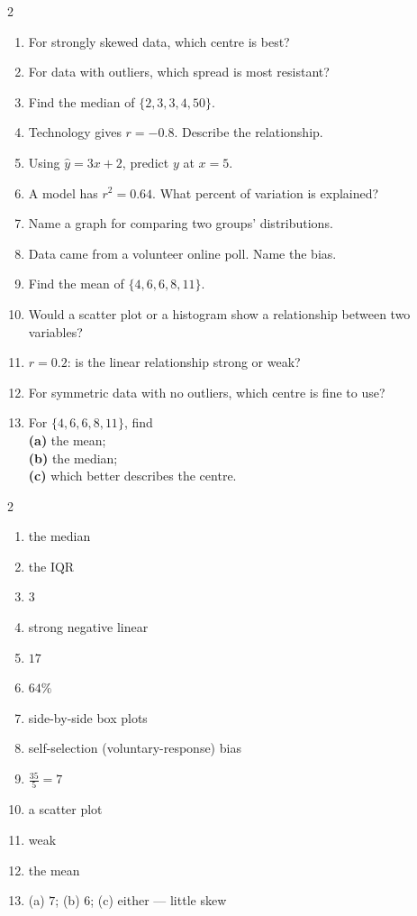 \documentclass[11pt]{article}
\begin{document}
\clearpage
{}

\begin{recapbox}
\begin{multicols}{2}
\small
\begin{enumerate}[leftmargin=*,itemsep=3pt]
  \item For strongly skewed data, which centre is best?
  \item For data with outliers, which spread is most resistant?
  \item Find the median of $\{2,3,3,4,50\}$.
  \item Technology gives $r=-0.8$. Describe the relationship.
  \item Using $\hat y=3x+2$, predict $y$ at $x=5$.
  \item A model has $r^{2}=0.64$. What percent of variation is explained?
  \item Name a graph for comparing two groups' distributions.
  \item Data came from a volunteer online poll. Name the bias.
  \item Find the mean of $\{4,6,6,8,11\}$.
  \item Would a scatter plot or a histogram show a relationship between two variables?
  \item $r=0.2$: is the linear relationship strong or weak?
  \item For symmetric data with no outliers, which centre is fine to use?
  \item For $\{4,6,6,8,11\}$, find \\ \textbf{(a)} the mean; \\ \textbf{(b)} the median; \\ \textbf{(c)} which better describes the centre.
\end{enumerate}
\end{multicols}
\end{recapbox}

\begin{keybox}
\begin{multicols}{2}
\small
\begin{enumerate}[leftmargin=*,itemsep=3pt]
  \item the median
  \item the IQR
  \item $3$
  \item strong negative linear
  \item $17$
  \item $64\%$
  \item side-by-side box plots
  \item self-selection (voluntary-response) bias
  \item $\tfrac{35}{5}=7$
  \item a scatter plot
  \item weak
  \item the mean
  \item (a) $7$; (b) $6$; (c) either --- little skew
\end{enumerate}
\end{multicols}
\end{keybox}
\end{document}
